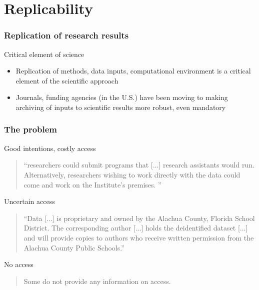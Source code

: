 \section{Replicability}



\begin{frame}
	\frametitle{Replication of research results}
	\begin{block}{Critical element of science}
		\begin{itemize}
			\item Replication of methods, data inputs, computational environment is a critical element of the scientific approach
			\item Journals, funding agencies (in the U.S.) have been moving to making archiving of inputs to scientific results more robust, even mandatory
		\end{itemize}
	\end{block}
\end{frame}


\begin{frame}
	\frametitle{The problem}
	\begin{block}{Good intentions, costly access}
		\begin{quote}
			``researchers could submit programs that [...] research assistants
			would run. Alternatively, researchers wishing to work directly with the data could come and
			work on the Institute's premises. ''
		\end{quote}
	\end{block}
	\pause
	\begin{block}{Uncertain access}
		\begin{quote}
			``Data [...] is proprietary and owned by the Alachua
			County, Florida School District. The corresponding author [...] holds the deidentified
			dataset [...] and will provide copies to
			authors who receive written permission from the Alachua County Public Schools.''
		\end{quote}
	\end{block}
	\pause
	\begin{block}{No access}
		\begin{quote}
			Some do not provide any information on access.	
		\end{quote}
	\end{block}
\end{frame}




